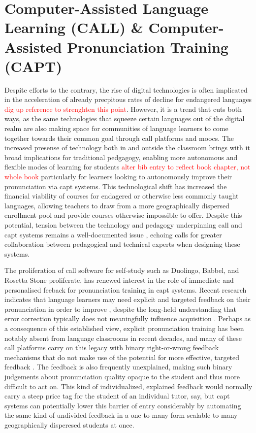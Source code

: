 \documentclass[thesis]{cluu}
\newcommand{\todo}[1]{\textcolor{red}{#1}}
\begin{document}
\section{Computer-Assisted Language Learning (CALL) \& Computer-Assisted Pronunciation Training (CAPT)}
Despite efforts to the contrary, the rise of digital technologies is often implicated in the acceleration of already precpitous rates of decline for endangered languages \todo{dig up reference to strenghten this point}. However, it is a trend that cuts both ways, as the same technologies that squeeze certain languages out of the digital realm are also making space for communities of language learners to come together towards their common goal through \gls{call} platforms and \gls{mooc}s. The increased presense of technology both in and outside the classroom brings with it broad implications for traditional pedgagogy, enabling more autonomous and flexible modes of learning for students \parencite{spolskyHandbookEducationalLinguistics2008}\todo{alter bib entry to reflect book chapter, not whole book} particularly for learners looking to autonomously improve their pronunciation
 via \gls{capt} systems. This technological shift has increased the financial viability of courses for endagered or otherwise less commonly taught languages, allowing teachers to draw from a more geographically dispersed enrollment pool and provide courses otherwise impossible to offer. Despite this potential, tension between the technology and pedagogy underpinning \gls{call} and \gls{capt} systems remains a well-documented issue \parencite{rogerson-revellComputerAssistedPronunciationTraining2021}, echoing calls for greater collaboration between pedagogical and technical experts when designing these systems.

The proliferation of \gls{call} software for self-study such as Duolingo, Babbel, and Rosetta Stone proliferate, has renewed interest in the role of immediate and personalised feeback for pronunciation training in \gls{capt} systems. Recent research indicates that language learners may need explicit and targeted feedback on their pronunciation in order to improve \parencite{bajorek2017l2}, despite the long-held understanding that error correction typically does not meaningfully influence acquisition \parencite{krashenPrinciplesPracticeSecond1984}. Perhaps as a consequence of this established view, explicit pronunciation training has been notably absent from language classrooms in recent decades, and many of these \gls{call} platforms carry on this legacy with binary right-or-wrong feedback mechanisms that do not make use of the potential for more effective, targeted feedback \parencite{bajorek2017l2}. The feedback is also frequently unexplained, making such binary judgements about pronunciation quality opaque to the student and thus more difficult to act on. This kind of individualized, explained feedback would normally carry a steep price tag for the student of an individual tutor, say, but \gls{capt} systems can potentially lower this barrier of entry considerably by automating the same kind of undivided feedback in a one-to-many form scalable to many geographically disperesed students at once. 
\end{document}
